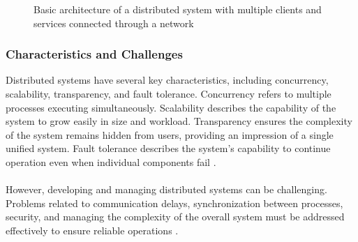 \begin{figure}[H]
	\centering
	\caption{Basic architecture of a distributed system with multiple clients and services connected through a network}
	\label{fig:distributed_architecture}
\end{figure}


\subsubsection{Characteristics and Challenges}

Distributed systems have several key characteristics, including concurrency, scalability, transparency, and fault tolerance. Concurrency refers to multiple processes executing simultaneously. Scalability describes the capability of the system to grow easily in size and workload. Transparency ensures the complexity of the system remains hidden from users, providing an impression of a single unified system. Fault tolerance describes the system's capability to continue operation even when individual components fail \cite{tanenbaum2017}.
\\
\\
However, developing and managing distributed systems can be challenging. Problems related to communication delays, synchronization between processes, security, and managing the complexity of the overall system must be addressed effectively to ensure reliable operations \cite{coulouris2012}.

